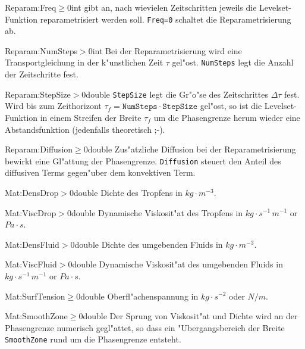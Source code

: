 \begin{Desc}
{Reparam:Freq}{$\geq0$}{int}
gibt an, nach wievielen Zeitschritten jeweils die Levelset-Funktion
reparametrisiert werden soll. \verb|Freq=0| schaltet die Reparametrisierung ab.
\end{Desc}
%
\begin{Desc}
{Reparam:NumSteps}{$>0$}{int}
Bei der Reparametrisierung wird eine Transportgleichung in der k"unstlichen
Zeit $\tau$ gel"ost. \verb|NumSteps| legt die Anzahl der Zeitschritte fest.
\end{Desc}
%
\begin{Desc}
{Reparam:StepSize}{$>0$}{double}
\verb|StepSize| legt die Gr"o"se des Zeitschrittes $\Delta\tau$ fest. Wird bis
zum Zeithorizont $\tau_f=\mathtt{NumSteps}\cdot\mathtt{StepSize}$ gel"ost, so
ist die Levelset-Funktion in einem Streifen der Breite $\tau_f$ um die
Phasengrenze herum wieder eine Abstandsfunktion (jedenfalls theoretisch ;-).
\end{Desc}
%
\begin{Desc}
{Reparam:Diffusion}{$\geq0$}{double}
Zus"atzliche Diffusion bei der Reparametrisierung bewirkt eine Gl"attung der
Phasengrenze. \verb|Diffusion| steuert den Anteil des diffusiven Terms
gegen"uber dem konvektiven Term. 
\end{Desc}


\begin{Desc}
{Mat:DensDrop}{$>0$}{double}
Dichte des Tropfens in $kg\cdot m^{-3}$.
\end{Desc}
%
\begin{Desc}
{Mat:ViscDrop}{$>0$}{double}
Dynamische Viskosit"at des Tropfens in $kg\cdot s^{-1}\, m^{-1}$ or $Pa\cdot s$.
\end{Desc}
%
\begin{Desc}
{Mat:DensFluid}{$>0$}{double}
Dichte des umgebenden Fluids in $kg\cdot m^{-3}$.
\end{Desc}
%
\begin{Desc}
{Mat:ViscFluid}{$>0$}{double}
Dynamische Viskosit"at des umgebenden Fluids in $kg\cdot s^{-1}\, m^{-1}$ or 
$Pa\cdot s$.
\end{Desc}
%
\begin{Desc}
{Mat:SurfTension}{$\geq0$}{double}
Oberfl"achenspannung in $kg\cdot s^{-2}$ oder $N/m$.
\end{Desc}
%
\begin{Desc}
{Mat:SmoothZone}{$\geq0$}{double}
Der Sprung von Viskosit"at und Dichte wird an der Phasengrenze numerisch
gegl"attet, so dass ein "Ubergangsbereich der Breite \verb|SmoothZone| rund um
die Phasengrenze entsteht.
\end{Desc}


